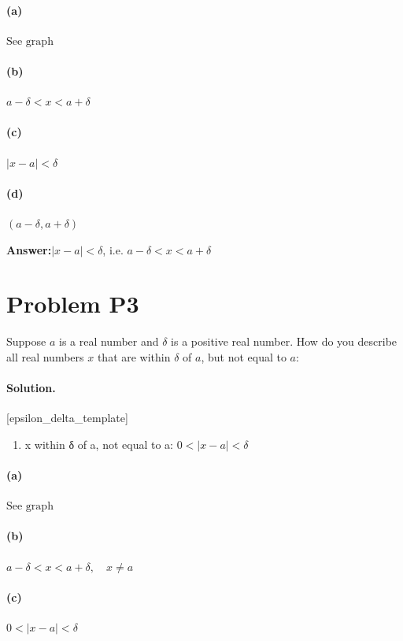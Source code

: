 \documentclass[11pt,a4paper]{article}
\newcommand{\solvertag}[1]{{\footnotesize\color{gray}\textsf{[#1]}}}
\begin{document}
\paragraph{(a)} $\text{See graph}$

\paragraph{(b)} $a - \delta < x < a + \delta$

\paragraph{(c)} $|x - a| < \delta$

\paragraph{(d)} $(a - \delta, a + \delta)$

\noindent\textbf{Answer:}\quad $|x - a| < \delta$, i.e. $a - \delta < x < a + \delta$

\medskip

\section*{Problem P3}
Suppose $a$ is a real number and $\delta$ is a positive real number. How do you describe all real numbers $x$ that are within $\delta$ of $a$, but not equal to $a$:

\paragraph{Solution.} \solvertag{epsilon\_delta\_template} 

\begin{enumerate}[leftmargin=*]
  \item x within δ of a, not equal to a: $0 < |x - a| < \delta$
\end{enumerate}

\paragraph{(a)} $\text{See graph}$

\paragraph{(b)} $a - \delta < x < a + \delta, \quad x \neq a$

\paragraph{(c)} $0 < |x - a| < \delta$
\end{document}
